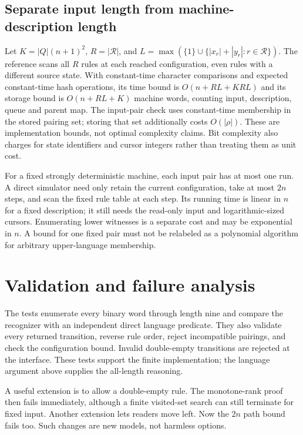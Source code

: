 \subsection{Separate input length from machine-description length}
Let $K=|Q|(n+1)^2$, $R=|\mathcal R|$, and
$L=\max(\{1\}\cup\{|x_r|+|y_r|:r\in\mathcal R\})$.
The reference scans all $R$ rules at
each reached configuration, even rules with a different source state.
With constant-time character comparisons and expected constant-time hash
operations, its time bound is $O(n+RL+KRL)$ and its storage bound is
$O(n+RL+K)$ machine words, counting input, description, queue and parent map.
The input-pair check uses constant-time membership in the stored pairing set;
storing that set additionally costs $O(|\rho|)$. These are implementation
bounds, not optimal complexity claims. Bit complexity also charges for
state identifiers and cursor integers rather than treating them as unit cost.

For a fixed strongly deterministic machine, each input pair has at most one
run. A direct simulator need only retain the current configuration, take at
most $2n$ steps, and scan the fixed rule table at each step. Its running time
is linear in $n$ for a fixed description; it still needs the read-only input
and logarithmic-sized cursors. Enumerating lower witnesses is a separate cost
and may be exponential in $n$. A bound for one fixed pair must not be relabeled
as a polynomial algorithm for arbitrary upper-language membership.

\section{Validation and failure analysis}
The tests enumerate every binary word through length nine and compare the
recognizer with an independent direct language predicate. They also validate
every returned transition, reverse rule order, reject incompatible pairings,
and check the configuration bound. Invalid double-empty transitions are
rejected at the interface. These tests support the finite implementation;
the language argument above supplies the all-length reasoning.

A useful extension is to allow a double-empty rule. The monotone-rank proof
then fails immediately, although a finite visited-set search can still
terminate for fixed input. Another extension lets readers move left. Now the
$2n$ path bound fails too. Such changes are new models, not harmless options.

